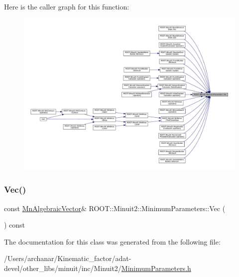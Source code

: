 Here is the caller graph for this function\+:
\nopagebreak
\begin{figure}[H]
\begin{center}
\leavevmode
\includegraphics[width=350pt]{db/db8/classROOT_1_1Minuit2_1_1MinimumParameters_ad93c17d14f4ddbc66c91107ff3a80dbe_icgraph}
\end{center}
\end{figure}
\mbox{\label{classROOT_1_1Minuit2_1_1MinimumParameters_ad93c17d14f4ddbc66c91107ff3a80dbe}} 
\subsubsection{\texorpdfstring{Vec()}{Vec()}\hspace{0.1cm}{\footnotesize\ttfamily [3/3]}}
{\footnotesize\ttfamily const \mbox{\hyperlink{namespaceROOT_1_1Minuit2_a62ed97730a1ca8d3fbaec64a19aa11c9}{Mn\+Algebraic\+Vector}}\& R\+O\+O\+T\+::\+Minuit2\+::\+Minimum\+Parameters\+::\+Vec (\begin{DoxyParamCaption}{ }\end{DoxyParamCaption}) const\hspace{0.3cm}{\ttfamily [inline]}}



The documentation for this class was generated from the following file\+:\begin{DoxyCompactItemize}
\item 
/\+Users/archanar/\+Kinematic\+\_\+factor/adat-\/devel/other\+\_\+libs/minuit/inc/\+Minuit2/\mbox{\hyperlink{adat-devel_2other__libs_2minuit_2inc_2Minuit2_2MinimumParameters_8h}{Minimum\+Parameters.\+h}}\end{DoxyCompactItemize}

